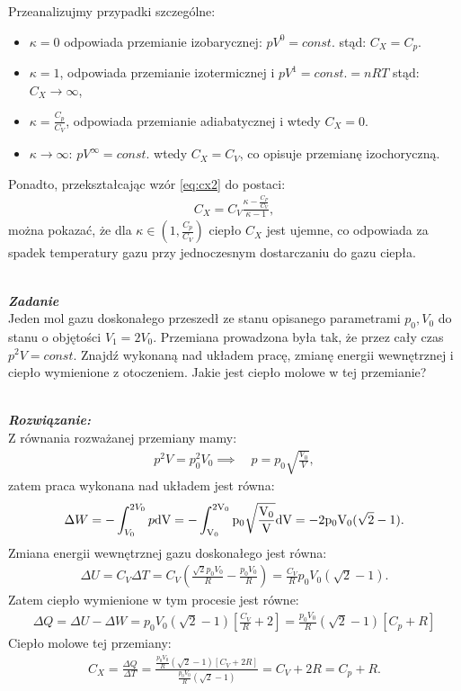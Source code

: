 \documentclass[11pt,a4paper]{article}
\newcounter{zadanie}\newcommand{\zadanie}[1][]{\addtocounter{zadanie}{1} ~\\  {\bf \emph{Zadanie \arabic{zadanie} #1 }} \\}
\newcounter{rozwiazanie}\newcommand{\rozwiazanie}[1][]{\addtocounter{rozwiazanie}{1} ~\\  {\bf \emph{Rozwiązanie: }} \\}
\begin{document}
Przeanalizujmy przypadki szczególne:
\begin{itemize}
\item $\kappa = 0$  odpowiada przemianie izobarycznej:  $pV^{0} = const.$ stąd: $C_X = C_p$.
\item $\kappa =1$, odpowiada przemianie izotermicznej i   $pV^{1} = const.= nRT$  stąd: $C_X \rightarrow \infty$,
\item $\kappa = \frac{C_p}{C_V}$, odpowiada przemianie adiabatycznej i wtedy $C_X = 0$.
\item $\kappa \rightarrow \infty$: $pV^{\infty} = const. $ wtedy $C_X = C_V$, co opisuje przemianę izochoryczną.
\end{itemize}

\vspace{1cm}
Ponadto, przekształcając wzór \eqref{eq:cx2} do postaci:
\begin{align}
C_X =C_V \frac{\kappa - \frac{C_P}{C_V}}{\kappa-1},
\end{align}
można pokazać, że dla $\kappa \in  \left( 1,\frac{C_p}{C_V}\right)$ ciepło $C_X$ jest ujemne, co odpowiada za spadek temperatury gazu przy  jednoczesnym dostarczaniu do gazu ciepła. 

\newpage
\zadanie
Jeden mol gazu doskonałego przeszedł ze stanu opisanego parametrami
$p_0, V_0$ do stanu o objętości $V_1 = 2 V_0$.
Przemiana prowadzona była tak, że przez cały czas $p^2 V = const$.
Znajdź wykonaną nad układem pracę, zmianę energii wewnętrznej i ciepło wymienione z otoczeniem.
Jakie jest ciepło molowe w tej przemianie?
\vspace{5mm}
\rozwiazanie 
Z równania rozważanej przemiany mamy:
\begin{align}
p^2 V = p_0^2 V_0 \implies \quad p = p_0 \sqrt{\frac{V_0}{V}},
\end{align}
zatem praca wykonana nad układem jest równa:
\begin{align}
\Delta W = - \int_{V_0}^{2 V_0} p \rm{d} V =  - \int_{V_0}^{2 V_0}  p_0 \sqrt{\frac{V_0}{V}} \rm{d} V  = - 2 p_0 V_0 (\sqrt{2}-1).
\end{align}
Zmiana energii wewnętrznej gazu doskonałego jest równa:
\begin{align}
\Delta U =   C_V \Delta T = C_V \left( \frac{\sqrt{2}p_0 V_0}{R} -  \frac{p_0 V_0}{R} \right) = \frac{C_V}{R} p_0 V_0 ( \sqrt{2}-1).
\end{align}
Zatem ciepło wymienione w tym procesie jest równe:
\begin{align}
\Delta Q = \Delta U - \Delta W = p_0 V_0{(\sqrt{2}-1)\left[ \frac{C_V}{R} + 2 \right]} = \frac{p_0 V_0}{R}(\sqrt{2}-1) \left[ C_p + R\right]
\end{align}
Ciepło molowe tej przemiany:
\begin{align}
C_X = \frac{\Delta Q}{\Delta T } = \frac{ \frac{p_0 V_0}{R}(\sqrt{2}-1) \left[ C_V + 2 R\right]}{\frac{p_0 V_0}{R}(\sqrt{2}-1)}= C_V + 2 R = C_p + R.
\end{align}
\end{document}
